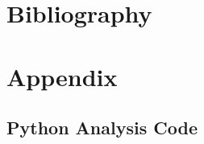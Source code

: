 \documentclass[12pt,a4paper,oneside]{report}
\begin{document}


\pagebreak
\chapter{Bibliography}
	\printbibliography[heading=none]

\pagebreak


\setcounter{page}{2}
\chapter{Appendix}
\begin{appendices}

%
\section{Python Analysis Code}

\end{appendices}
\end{document}
